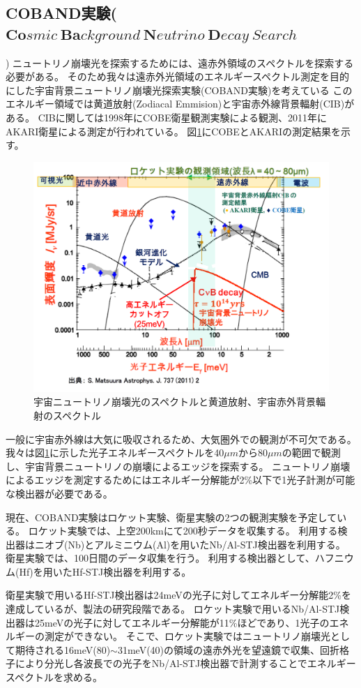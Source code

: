 \subsection{COBAND実験($\bm{Co}smic\ \bm{Ba}ckground\ \bm{N}eutrino\ \bm{D}ecay\ Search$})	%
ニュートリノ崩壊光を探索するためには、遠赤外領域のスペクトルを探索する必要がある。
そのため我々は遠赤外光領域のエネルギースペクトル測定を目的にした宇宙背景ニュートリノ崩壊光探索実験(COBAND実験)を考えている
このエネルギー領域では黄道放射(Zodiacal Emmision)と宇宙赤外線背景輻射(CIB)がある。
CIBに関しては1998年にCOBE衛星観測実験による観測、2011年にAKARI衛星による測定が行われている。
図\ref{2_3_1}にCOBEとAKARIの測定結果を示す。
\begin{figure}[!htbp]
	\begin{center}
	\includegraphics[width=12.0cm]{./Chapter/Chapter1/Picture/2_3_1.png}
    	\caption{宇宙ニュートリノ崩壊光のスペクトルと黄道放射、宇宙赤外背景輻射のスペクトル}
    	\label{2_3_1}
  	\end{center}
\end{figure}	
一般に宇宙赤外線は大気に吸収されるため、大気圏外での観測が不可欠である。
我々は図{\ref{2_3_1}}に示した光子エネルギースペクトルを40$\mu m$から80$\mu m$の範囲で観測し、宇宙背景ニュートリノの崩壊によるエッジを探索する。
ニュートリノ崩壊によるエッジを測定するためにはエネルギー分解能が2\%以下で1光子計測が可能な検出器が必要である。
\par
現在、COBAND実験はロケット実験、衛星実験の2つの観測実験を予定している。
ロケット実験では、上空200kmにて200秒データを収集する。
利用する検出器はニオブ(Nb)とアルミニウム(Al)を用いたNb/Al-STJ検出器を利用する。
衛星実験では、100日間のデータ収集を行う。
利用する検出器として、ハフニウム(Hf)を用いたHf-STJ検出器を利用する。
\par
衛星実験で用いるHf-STJ検出器は24meVの光子に対してエネルギー分解能2\%を達成しているが、製法の研究段階である。
ロケット実験で用いるNb/Al-STJ検出器は25meVの光子に対してエネルギー分解能が11\%ほどであり、1光子のエネルギーの測定ができない。
そこで、ロケット実験ではニュートリノ崩壊光として期待される16meV(80\um)$\sim$31meV(40\um)の領域の遠赤外光を望遠鏡で収集、回折格子により分光し各波長での光子をNb/Al-STJ検出器で計測することでエネルギースペクトルを求める。


